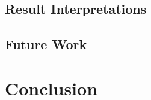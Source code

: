 \documentclass[10pt,sigconf,letterpaper,nonacm]{acmart}
\begin{document}
\subsection{Result Interpretations}

\subsection{Future Work}


\section{Conclusion}





\nocite{*}

\end{document}
